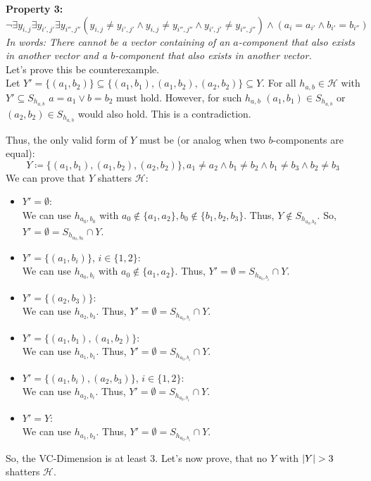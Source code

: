 \documentclass[12pt]{article}
\DeclarePairedDelimiter\abs{\lvert}{\rvert}
\begin{document}
\begin{enumerate}[label=(\alph*)]
			\textbf{Property 3:}
			$$\neg \exists y_{i, j} \exists y_{i', j'} \exists y_{i'', j''} (y_{i,j} \neq y_{i',j'} \land y_{i,j} \neq y_{i'',j''} \land y_{i',j'} \neq y_{i'',j''}) \land (a_i = a_{i'} \land b_{i'} = b_{i''})$$
			\textit{In words: There cannot be a vector containing of an $a$-component that also exists in another vector and a $b$-component that also exists in another vector.} \\
			Let's prove this be counterexample. \\
			Let $Y' = \{(a_1, b_2)\} \subseteq \{(a_1, b_1), (a_1, b_2), (a_2, b_2)\} \subseteq Y$.
			For all $h_{a,b} \in \mathcal{H}$ with $Y' \subseteq S_{h_{a,b}}$ $a=a_1 \lor b=b_2$ must hold. However, for such $h_{a,b}$ $(a_1, b_1) \in S_{h_{a,b}}$ or $(a_2, b_2) \in S_{h_{a,b}}$ would also hold. This is a contradiction.

			Thus, the only valid form of $Y$ must be (or analog when two $b$-components are equal):
			$$Y \coloneqq \{(a_1, b_1), (a_1, b_2), (a_2, b_2)\}, a_1 \neq a_2 \land b_1 \neq b_2 \land b_1 \neq b_3 \land b_2 \neq b_3$$
			We can prove that $Y$ shatters $\mathcal{H}$:
			\begin{itemize}
				\item	$Y' = \emptyset$: \\
						We can use $h_{a_0, b_0}$ with $a_0 \not\in \{a_1, a_2\}, b_0 \not\in \{b_1, b_2, b_3\}$. Thus, $Y \not\in S_{h_{a_0,b_0}}$. So, $Y' = \emptyset = S_{h_{a_0,b_0}} \cap Y$.
				\item	$Y' = \{(a_1, b_i)\}$, $i \in \{1,2\}$: \\
						We can use $h_{a_0, b_i}$ with $a_0 \not\in \{a_1, a_2\}$. Thus, $Y' = \emptyset = S_{h_{a_0,b_i}} \cap Y$.
				\item	$Y' = \{(a_2, b_3)\}$: \\
						We can use $h_{a_2, b_3}$. Thus, $Y' = \emptyset = S_{h_{a_0,b_i}} \cap Y$.
				\item	$Y' = \{(a_1, b_1), (a_1, b_2)\}$: \\
						We can use $h_{a_1, b_1}$. Thus, $Y' = \emptyset = S_{h_{a_0,b_i}} \cap Y$.
				\item	$Y' = \{(a_1, b_i), (a_2, b_3)\}$, $i \in \{1,2\}$: \\
						We can use $h_{a_2, b_i}$. Thus, $Y' = \emptyset = S_{h_{a_0,b_i}} \cap Y$.
				\item	$Y' = Y$: \\
						We can use $h_{a_1, b_3}$. Thus, $Y' = \emptyset = S_{h_{a_0,b_i}} \cap Y$.
			\end{itemize}
			So, the VC-Dimension is at least $3$. Let's now prove, that no $Y$ with $\abs{Y} > 3$ shatters $\mathcal{H}$.


\end{enumerate}
\end{document}
